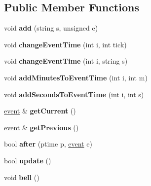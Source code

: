 \subsection*{Public Member Functions}
\begin{DoxyCompactItemize}
\item 
\mbox{\label{structtimeTable_adfcfec62e9a80e6e4c1c3bea61f56b46}} 
void {\bfseries add} (string s, unsigned e)
\item 
\mbox{\label{structtimeTable_a56ad08bdfbfa3e9ed26150ad340cbcbd}} 
void {\bfseries change\+Event\+Time} (int i, int tick)
\item 
\mbox{\label{structtimeTable_a10463383ade0b811376d5cfe3e3a52e1}} 
void {\bfseries change\+Event\+Time} (int i, string s)
\item 
\mbox{\label{structtimeTable_ac2424fec4a3b8ed8d3d53a47cc75794c}} 
void {\bfseries add\+Minutes\+To\+Event\+Time} (int i, int m)
\item 
\mbox{\label{structtimeTable_ad440c828f6bd84b5de35a47d8b1fcc90}} 
void {\bfseries add\+Seconds\+To\+Event\+Time} (int i, int s)
\item 
\mbox{\label{structtimeTable_a051a72dbd35fc2fe344ec45d32c8d143}} 
\mbox{\hyperlink{structevent}{event}} \& {\bfseries get\+Current} ()
\item 
\mbox{\label{structtimeTable_a952cb5000c669cfc61241f7abfade276}} 
\mbox{\hyperlink{structevent}{event}} \& {\bfseries get\+Previous} ()
\item 
\mbox{\label{structtimeTable_a5d435684eb3fd7ca8be8bc4becfbb3a5}} 
bool {\bfseries after} (ptime p, \mbox{\hyperlink{structevent}{event}} e)
\item 
\mbox{\label{structtimeTable_aa82f1bfce0bf3d1cbc828a1c0776a35d}} 
bool {\bfseries update} ()
\item 
\mbox{\label{structtimeTable_af6ff36f262be339c23c027d90f202ec1}} 
void {\bfseries bell} ()
\end{DoxyCompactItemize}
